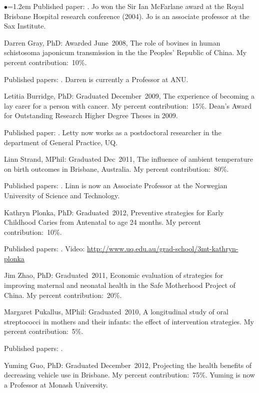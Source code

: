 \documentclass[a4paper,11pt]{article}
\renewcommand{\labelitemi}{$\bullet$}
\begin{document}
\begin{raggedright}
\begin{list}{\labelitemi}{\leftmargin=1.2em}
Published paper: . Jo won the Sir Ian McFarlane award at the Royal Brisbane Hospital research conference (2004). Jo is an associate professor at the Sax Institute.

\item Darren Gray, PhD: Awarded June~2008, The role of bovines in human schistosoma japonicum transmission in the the Peoples' Republic of China. My percent contribution:~10\%.

Published papers: . Darren is currently a Professor at ANU.

\item Letitia Burridge, PhD: Graduated December~2009, The experience of becoming a lay carer for a person with cancer. My percent contribution:~15\%. Dean's Award for Outstanding Research Higher Degree Theses in 2009.

Published paper: . Letty now works as a postdoctoral researcher in the department of General Practice, UQ.

\item Linn Strand, MPhil: Graduated Dec~2011, The influence of ambient temperature on birth outcomes in Brisbane, Australia. My percent contribution:~80\%.

Published papers: . Linn is now an Associate Professor at the Norwegian University of Science and Technology.

\item Kathryn Plonka, PhD: Graduated~2012, Preventive strategies for Early Childhood Caries from Antenatal to age 24 months. My percent contribution:~10\%.

Published papers: . Video: \url{http://www.uq.edu.au/grad-school/3mt-kathryn-plonka}

\item Jim Zhao, PhD: Graduated~2011, Economic evaluation of strategies for improving maternal and neonatal health in the Safe Motherhood Project of China. My percent contribution:~20\%.

\item Margaret Pukallus, MPhil: Graduated~2010, A longitudinal study of oral streptococci in mothers and their infants: the effect of intervention strategies. My percent contribution:~5\%.

Published papers: .

\item Yuming Guo, PhD: Graduated December~2012, Projecting the health benefits of decreasing vehicle use in Brisbane. My percent contribution:~75\%. Yuming is now a Professor at Monash University.


\end{list}
\end{raggedright}
\end{document}
